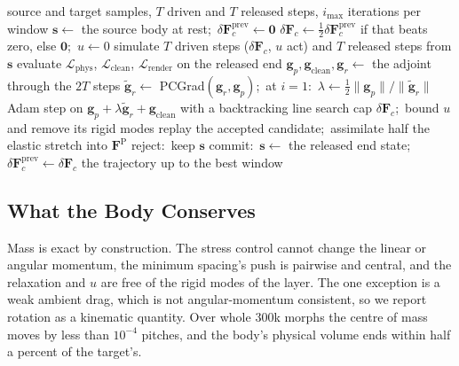 \begin{algorithm}[t]
  \caption{Settled-window morph}\label{ch4:alg_window}
  \begin{algorithmic}[1]
    \Require source and target samples, $T$ driven and $T$ released steps, $i_{\max}$ iterations per window
    \State $\mathbf{s}\gets$ the source body at rest;\ $\delta\mathbf{F}^{\mathrm{prev}}_c\gets\mathbf{0}$
      \State $\delta\mathbf{F}_c\gets\tfrac12\delta\mathbf{F}^{\mathrm{prev}}_c$ if that beats zero, else $\mathbf{0}$;\ $u\gets 0$
        \State simulate $T$ driven steps ($\delta\mathbf{F}_c$, $u$ act) and $T$ released steps from $\mathbf{s}$
        \State evaluate $\mathcal{L}_{\mathrm{phys}}$, $\mathcal{L}_{\mathrm{clean}}$, $\mathcal{L}_{\mathrm{render}}$ on the released end
        \State $\mathbf{g}_p,\mathbf{g}_{\mathrm{clean}},\mathbf{g}_r\gets$ the adjoint through the $2T$ steps
        \State $\tilde{\mathbf{g}}_r\gets$ PCGrad$(\mathbf{g}_r,\mathbf{g}_p)$;\ at $i=1$:\ $\lambda\gets\tfrac12\lVert\mathbf{g}_p\rVert/\lVert\tilde{\mathbf{g}}_r\rVert$
        \State Adam step on $\mathbf{g}_p+\lambda\tilde{\mathbf{g}}_r+\mathbf{g}_{\mathrm{clean}}$ with a backtracking line search
        \State cap $\delta\mathbf{F}_c$;\ bound $u$ and remove its rigid modes
      \EndFor
      \State replay the accepted candidate;\ assimilate half the elastic stretch into $\mathbf{F}^{\mathrm{P}}$
        \State reject:\ keep $\mathbf{s}$
      \Else
        \State commit:\ $\mathbf{s}\gets$ the released end state;\ $\delta\mathbf{F}^{\mathrm{prev}}_c\gets\delta\mathbf{F}_c$
      \EndIf
    \EndWhile
    \State \Return the trajectory up to the best window
  \end{algorithmic}
\end{algorithm}

\subsection{What the Body Conserves}
\label{ch4:sec_conservation}
Mass is exact by construction. The stress control cannot change the linear or angular momentum, the minimum spacing's
push is pairwise and central, and the relaxation and $u$ are free of the rigid modes of the layer. The one exception is a
weak ambient drag, which is not angular-momentum consistent, so we report rotation as a kinematic quantity. Over whole
300k morphs the centre of mass moves by less than $10^{-4}$ pitches, and the body's physical volume ends within half a
percent of the target's.

